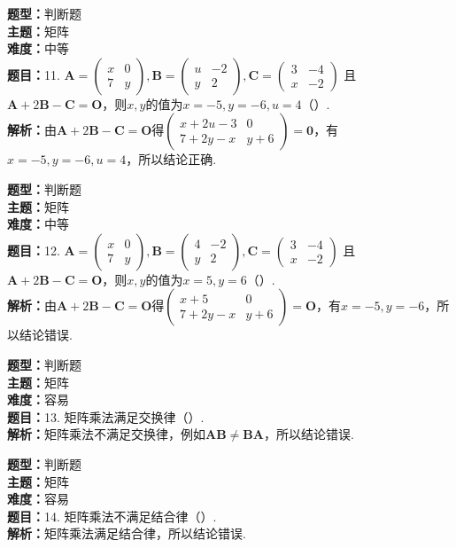 \documentclass{ctexart}
\newenvironment{question}[5]{%
	\noindent\textbf{题型：}#1\\
	\textbf{主题：}#2\\
	\textbf{难度：}#3\\
	\textbf{题目：}#4\\
	\textbf{解析：}#5\\
	\vspace{1em}
}{}
\begin{document}
	
	\begin{question}
		{判断题}
		{矩阵}
		{中等}
		{11. \(\mathbf{A}=\left(\begin{array}{cc}x & 0 \\ 7 & y\end{array}\right), \mathbf{B}=\left(\begin{array}{cc}u & -2 \\ y & 2\end{array}\right), \mathbf{C}=\left(\begin{array}{cc}3 & -4 \\ x & -2\end{array}\right)\) 且 \(\mathbf{A}+2\mathbf{B}-\mathbf{C}=\mathbf{O}\)，则\(x, y\)的值为\(x=-5, y=-6, u=4\)（）.}
		{由\(\mathbf{A}+2\mathbf{B}-\mathbf{C}=\mathbf{O}\)得\(\left(\begin{array}{cc}x+2u-3 & 0 \\ 7+2y-x & y+6\end{array}\right)=\mathbf{0}\)，有\(x=-5, y=-6, u=4\)，所以结论正确.}
	\end{question}
	
	\begin{question}
		{判断题}
		{矩阵}
		{中等}
		{12. \(\mathbf{A}=\left(\begin{array}{ll}x & 0 \\ 7 & y\end{array}\right), \mathbf{B}=\left(\begin{array}{cc}4 & -2 \\ y & 2\end{array}\right), \mathbf{C}=\left(\begin{array}{cc}3 & -4 \\ x & -2\end{array}\right)\) 且 \(\mathbf{A}+2\mathbf{B}-\mathbf{C}=\mathbf{O}\)，则\(x, y\)的值为\(x=5, y=6\)（）.}
		{由\(\mathbf{A}+2\mathbf{B}-\mathbf{C}=\mathbf{O}\)得\(\left(\begin{array}{cc}x+5 & 0 \\ 7+2y-x & y+6\end{array}\right)=\mathbf{O}\)，有\(x=-5, y=-6\)，所以结论错误.}
	\end{question}
	
	\begin{question}
		{判断题}
		{矩阵}
		{容易}
		{13. 矩阵乘法满足交换律（）.}
		{矩阵乘法不满足交换律，例如\(\mathbf{AB}\neq\mathbf{BA}\)，所以结论错误.}
	\end{question}
	
	\begin{question}
		{判断题}
		{矩阵}
		{容易}
		{14. 矩阵乘法不满足结合律（）.}
		{矩阵乘法满足结合律，所以结论错误.}
	\end{question}
	
\end{document}
